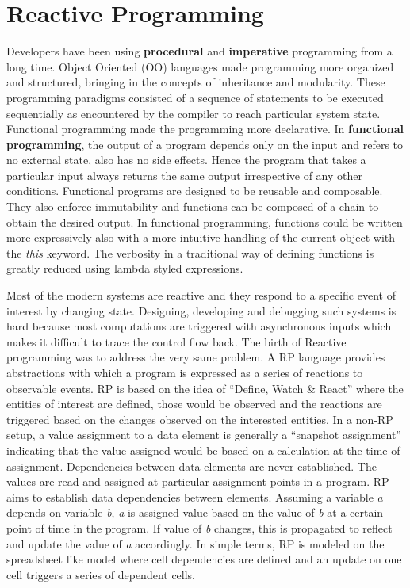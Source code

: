 \section {Reactive Programming}
Developers have been using \textbf{procedural} and \textbf{imperative} programming from a long time. 
Object Oriented (OO) languages made programming more organized and structured, bringing in the concepts of inheritance and modularity. 
These programming paradigms consisted of a sequence of statements to be executed sequentially as encountered by the compiler to reach particular system state. 
Functional programming made the programming more declarative. 
In \textbf{functional programming}, the output of a program depends only on the input and refers to no external state, also has no side effects\cite{Gifford:1986:IFI:319838.319848}. 
Hence the program that takes a particular input always returns the same output irrespective of any other conditions.
Functional programs are designed to be reusable and composable. 
They also enforce immutability and functions can be composed of a chain to obtain the desired output. 
In functional programming, functions could be written more expressively also with a more intuitive handling of the current object with the \textit{this} keyword. 
The verbosity in a traditional way of defining functions is greatly reduced using lambda styled expressions.

Most of the modern systems are reactive and they respond to a specific event of interest by changing state. 
Designing, developing and debugging such systems is hard because most computations are triggered with asynchronous inputs which makes it difficult to trace the control flow back\cite{Margara:2014:WDD:2611286.2611290}. 
The birth of Reactive programming was to address the very same problem. A RP language provides abstractions with which a program is expressed as a series of reactions to observable events\cite{Bainomugisha:2013:SRP:2501654.2501666}. 
RP is based on the idea of ``Define, Watch \& React''\cite{RPvsFP} where the entities of interest are defined, those would be observed and the reactions are triggered based on the changes observed on the interested entities. 
In a non-RP setup, a value assignment to a data element is generally a ``snapshot assignment'' indicating that the value assigned would be based on a calculation at the time of assignment. 
Dependencies between data elements are never established. The values are read and assigned at particular assignment points in a program. 
RP aims to establish data dependencies between elements. 
Assuming a variable \textit{a} depends on variable \textit{b}, \textit{a} is assigned value based on the value of \textit{b} at a certain point of time in the program. 
If value of \textit{b} changes, this is propagated to reflect and update the value of \textit{a} accordingly. 
In simple terms, RP is modeled on the spreadsheet like model where cell dependencies are defined and an update on one cell triggers a series of dependent cells\cite{Bainomugisha:2013:SRP:2501654.2501666}.

